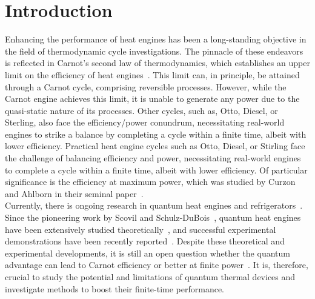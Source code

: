 \documentclass[aps,pra,twocolumn,showpacs,showkeys,groupedaddress,nobalancelastpage,nofootinbib,floatfix,superscriptaddress,longbibliography]{revtex4-2}
\begin{document}
\section{Introduction}
Enhancing the performance of heat engines has been a long-standing objective in the field of thermodynamic cycle investigations. The pinnacle of these endeavors is reflected in Carnot's second law of thermodynamics, which establishes an upper limit on the efficiency of heat engines~\cite{bhlitem57177}. This limit can, in principle, be attained through a Carnot cycle, comprising reversible processes. However, while the Carnot engine achieves this limit, it is unable to generate any power due to the quasi-static nature of its processes. Other cycles, such as, Otto, Diesel, or Sterling, also face the efficiency/power conundrum, necessitating real-world engines to strike a balance by completing a cycle within a finite time, albeit with lower efficiency. Practical heat engine cycles such as Otto, Diesel, or Stirling face the challenge of balancing efficiency and power, necessitating real-world engines to complete a cycle within a finite time, albeit with lower efficiency. Of particular significance is the efficiency at maximum power, which was studied by Curzon and Ahlborn in their seminal paper~\cite{doi:10.1119/1.10023}.\\

Currently, there is ongoing research in quantum heat engines and refrigerators~\cite{doi:10.1146/annurev-physchem-040513-103724,Kosloff2017TheQH,tuncer2020,kurizki_kofman_2022,10.1088/2053-2571/ab21c6}. Since the pioneering work by Scovil and Schulz-DuBois~\cite{PhysRevLett.2.262}, quantum heat engines have been extensively studied theoretically~\cite{1979,doi:10.1063/1.446862,doi:10.1063/1.461951,10.1063/1.471453,10.1119/1.18197,PhysRevLett.88.050602,PhysRevLett.89.116801,doi:10.1126/science.1078955,PhysRevE.68.016101,PhysRevLett.93.140403,PhysRevE.70.046110,PhysRevE.72.056110,Rezek_2006,PhysRevE.76.031105,PhysRevE.77.041118,PhysRevLett.109.203006,PhysRevE.90.022102,Hardal2015,PhysRevE.95.032139,Turkpence_2017,PhysRevB.96.104304,PhysRevE.96.062120,Niedenzu2018,PhysRevE.97.062153,Naseem:19,PhysRevE.100.012109,PhysRevE.102.062123,Hamedani_Raja_2021}, and successful experimental demonstrations have been recently reported~\cite{PhysRevLett.119.050602,PhysRevLett.122.110601,PhysRevLett.123.240601,Bouton2021,doi:10.1126/sciadv.abl7740,PhysRevA.106.022436,Zhang2022,e25020311}. Despite these theoretical and experimental developments, it is still an open question whether the quantum advantage can lead to Carnot efficiency or better at finite power~\cite{PhysRevLett.112.030602,Campisi2016,Kim2022}. It is, therefore, crucial to study the potential and limitations of quantum thermal devices and investigate methods to boost their finite-time performance.\\
\end{document}
